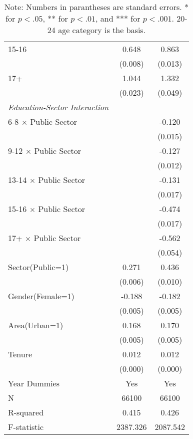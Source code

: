 \documentclass[12pt,author-year]{article}
\begin{document}
\begin{table}[H]
{{\begin{tabular}{l*{2}{c}}
15-16               &    0.648\sym{***}&    0.863\sym{***}\\
&  (0.008)         &  (0.013)         \\
17+                 &    1.044\sym{***}&    1.332\sym{***}\\
&  (0.023)         &  (0.049)         \\
				\hspace{-5mm} \textit{Education-Sector Interaction}	\\
6-8 $\times$ Public Sector&                  &   -0.120\sym{***}\\
&                  &  (0.015)         \\
9-12 $\times$ Public Sector&                  &   -0.127\sym{***}\\
&                  &  (0.012)         \\
13-14 $\times$ Public Sector&                  &   -0.131\sym{***}\\
&                  &  (0.017)         \\
15-16 $\times$ Public Sector&                  &   -0.474\sym{***}\\
&                  &  (0.017)         \\
17+ $\times$ Public Sector&                  &   -0.562\sym{***}\\
&                  &  (0.054)         \\
				Sector(Public=1)       &    0.271\sym{***}&    0.436\sym{***}\\
				&  (0.006)         &  (0.010)         \\
				Gender(Female=1)       &   -0.188\sym{***}&   -0.182\sym{***}\\
				&  (0.005)         &  (0.005)         \\
				Area(Urban=1)        &    0.168\sym{***}&    0.170\sym{***}\\
				&  (0.005)         &  (0.005)         \\
				Tenure        &    0.012\sym{***}&    0.012\sym{***}\\
				&  (0.000)         &  (0.000)         \\
				\midrule
Year Dummies        &      Yes         &      Yes         \\
N                   &  66100           &  66100         \\
R-squared          &    0.415         &    0.426         \\
F-statistic          & 2387.326         & 2087.542         \\
				\bottomrule
	\end{tabular}}}
		\caption*{{\scriptsize Note: Numbers in parantheses are standard errors. * for $p<.05$, ** for $p<.01$, and *** for $p<.001$. 20-24 age category is the basis.}}
\end{table}
\end{document}
